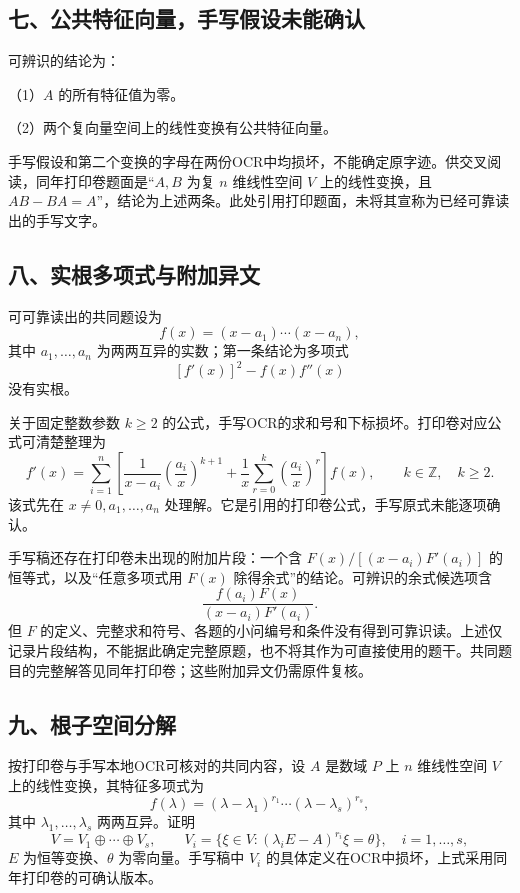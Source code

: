 \documentclass[11pt,fontset=fandol]{ctexart}
\begin{document}
\subsection{七、公共特征向量，手写假设未能确认}\label{ux4e03ux516cux5171ux7279ux5f81ux5411ux91cfux624bux5199ux5047ux8bbeux672aux80fdux786eux8ba4}

可辨识的结论为：

（1）\(A\) 的所有特征值为零。

（2）两个复向量空间上的线性变换有公共特征向量。

手写假设和第二个变换的字母在两份OCR中均损坏，不能确定原字迹。供交叉阅读，同年打印卷题面是``\(A,B\)
为复 \(n\) 维线性空间 \(V\) 上的线性变换，且
\(AB-BA=A\)''，结论为上述两条。此处引用打印题面，未将其宣称为已经可靠读出的手写文字。

\subsection{八、实根多项式与附加异文}\label{ux516bux5b9eux6839ux591aux9879ux5f0fux4e0eux9644ux52a0ux5f02ux6587}

可可靠读出的共同题设为 \[
f(x)=(x-a_1)\cdots(x-a_n),
\] 其中 \(a_1,\ldots,a_n\) 为两两互异的实数；第一条结论为多项式 \[
[f'(x)]^2-f(x)f''(x)
\] 没有实根。

关于固定整数参数 \(k\ge2\)
的公式，手写OCR的求和号和下标损坏。打印卷对应公式可清楚整理为 \[
f'(x)=\sum_{i=1}^n\left[\frac1{x-a_i}\left(\frac{a_i}{x}\right)^{k+1}
+\frac1x\sum_{r=0}^k\left(\frac{a_i}{x}\right)^r\right]f(x),\qquad k\in\mathbb Z,\quad k\ge2.
\] 该式先在 \(x\ne0,a_1,\ldots,a_n\)
处理解。它是引用的打印卷公式，手写原式未能逐项确认。

手写稿还存在打印卷未出现的附加片段：一个含 \(F(x)/[(x-a_i)F'(a_i)]\)
的恒等式，以及``任意多项式用 \(F(x)\)
除得余式''的结论。可辨识的余式候选项含 \[
\frac{f(a_i)F(x)}{(x-a_i)F'(a_i)}.
\] 但 \(F\)
的定义、完整求和符号、各题的小问编号和条件没有得到可靠识读。上述仅记录片段结构，不能据此确定完整原题，也不将其作为可直接使用的题干。共同题目的完整解答见同年打印卷；这些附加异文仍需原件复核。

\subsection{九、根子空间分解}\label{ux4e5dux6839ux5b50ux7a7aux95f4ux5206ux89e3}

按打印卷与手写本地OCR可核对的共同内容，设 \(A\) 是数域 \(P\) 上 \(n\)
维线性空间 \(V\) 上的线性变换，其特征多项式为 \[
f(\lambda)=(\lambda-\lambda_1)^{r_1}\cdots(\lambda-\lambda_s)^{r_s},
\] 其中 \(\lambda_1,\ldots,\lambda_s\) 两两互异。证明 \[
V=V_1\oplus\cdots\oplus V_s,\qquad
V_i=\{\xi\in V:(\lambda_iE-A)^{r_i}\xi=\theta\},\quad i=1,\ldots,s,
\] \(E\) 为恒等变换、\(\theta\) 为零向量。手写稿中 \(V_i\)
的具体定义在OCR中损坏，上式采用同年打印卷的可确认版本。
\end{document}
